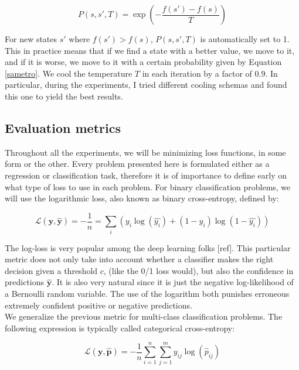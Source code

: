 \documentclass[10pt,a4paper,twoside]{book}
\begin{document}
\begin{itemize}
	\begin{equation}
	\label{sametro}
	P(s, s', T) = \exp\left( - \dfrac{f(s') - f(s)}{T} \right)
	\end{equation}
	
	For new states $s'$ where $f(s') > f(s)$, $P(s, s', T)$ is automatically set to 1. This in practice means that if we find a state with a better value, we move to it, and if it is worse, we move to it with a certain probability given by Equation \ref{sametro}. We cool the temperature $T$ in each iteration by a factor of $0.9$. In particular, during the experiments, I tried different cooling schemas and found this one to yield the best results.
\end{itemize}

\subsection{Evaluation metrics}
\label{evaluation}

Throughout all the experiments, we will be minimizing loss functions, in some form or the other. Every problem presented here is formulated either as a regression or classification task, therefore it is of importance to define early on what type of loss to use in each problem. For binary classification problems, we will use the logarithmic loss, also known as binary cross-entropy, defined by:

\begin{equation}
\mathcal{L}(\boldsymbol{y}, \boldsymbol{\hat{y}}) = -\dfrac{1}{n} = \sum_i \left(y_i \log(\hat{y_i}) + (1 - y_i)\log(1-\hat{y_i})\right)
\end{equation}

The log-loss is very popular among the deep learning folks [ref]. This particular metric does not only take into account whether a classifier makes the right decision given a threshold $c$, (like the 0/1 loss would), but also the confidence in predictions $\boldsymbol{\hat{y}}$. It is also very natural since it is just the negative log-likelihood of a Bernoulli random variable. The use of the logarithm both punishes erroneous extremely confident positive or negative predictions.\\

We generalize the previous metric for multi-class classification problems. The following expression is typically called categorical cross-entropy:

\begin{equation}
\mathcal{L}(\boldsymbol{y}, \boldsymbol{\hat{p}}) = - \dfrac{1}{n} \sum_{i=1}^n\sum_{j=1}^m y_{ij}\log(\hat{p}_{ij})
\end{equation}
\end{document}
